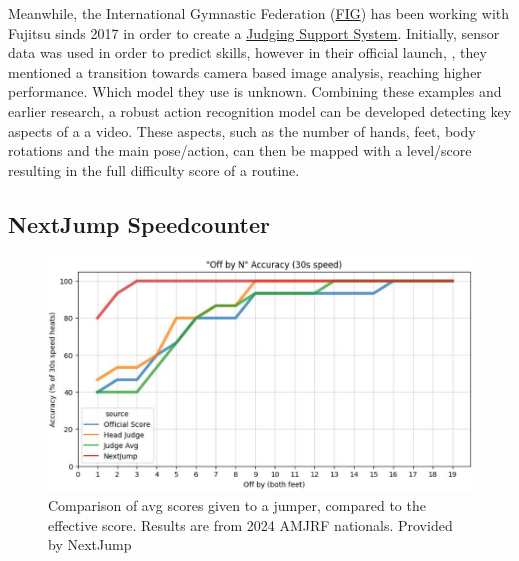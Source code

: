 Meanwhile, the International Gymnastic Federation (\href{https://www.gymnastics.sport/site/}{FIG}) has been working with Fujitsu sinds 2017 in order to create a \href{https://www.fujitsu.com/global/themes/data-driven/judging-support-system/}{Judging Support System}. Initially, sensor data was used in order to predict skills, however in their official launch, \autocite{Fujitsu2023launch}, they mentioned a transition towards camera based image analysis, reaching higher performance. Which model they use is unknown.
Combining these examples and earlier research, a robust action recognition model can be developed detecting key aspects of a a video. These aspects, such as the number of hands, feet, body rotations and the main pose/action, can then be mapped with a level/score resulting in the full difficulty score of a routine.

\subsection{NextJump Speedcounter}
\label{subsubsec:bp-literature-nextjump-speedcounter}


\begin{figure}
    \centering
    \includegraphics[width=0.95\linewidth]{img/nextjump-off-by-feet-judges}
    \caption[nextjump-results-multi]{Comparison of avg scores given to a jumper, compared to the effective score. Results are from 2024 AMJRF nationals. Provided by NextJump}
    \label{fig:nextjump-results-off-by-feet-judges-amjrf-2024}
\end{figure}

